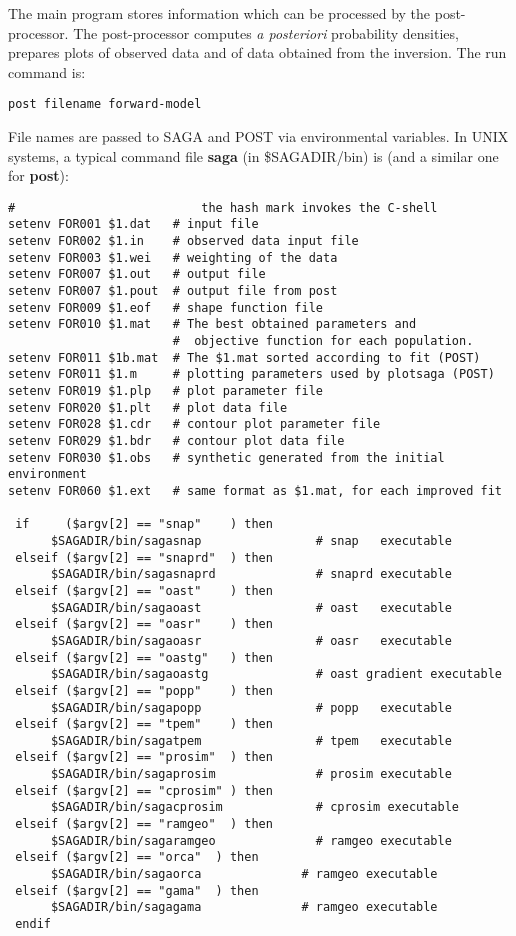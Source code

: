 \documentclass{saclantc}
\begin{document}
The main program stores information which can be processed by the 
post-processor.  The post-processor computes {\em a posteriori}
 probability densities, 
prepares plots of observed data and of data obtained from the inversion. 
The run command is:

{\tt post filename forward-model}


File names  are  passed  to   {\sf SAGA} and {\sf POST}   via 
environmental variables. In UNIX systems, a typical command  file 
{\bf saga} (in  \$SAGADIR/bin) is (and a similar one for {\bf post}):

\small
\begin{verbatim}
#                          the hash mark invokes the C-shell 
setenv FOR001 $1.dat   # input file
setenv FOR002 $1.in    # observed data input file
setenv FOR003 $1.wei   # weighting of the data 
setenv FOR007 $1.out   # output file
setenv FOR007 $1.pout  # output file from post
setenv FOR009 $1.eof   # shape function file
setenv FOR010 $1.mat   # The best obtained parameters and
                       #  objective function for each population.
setenv FOR011 $1b.mat  # The $1.mat sorted according to fit (POST)
setenv FOR011 $1.m     # plotting parameters used by plotsaga (POST)
setenv FOR019 $1.plp   # plot parameter file
setenv FOR020 $1.plt   # plot data file  
setenv FOR028 $1.cdr   # contour plot parameter file 
setenv FOR029 $1.bdr   # contour plot data file 
setenv FOR030 $1.obs   # synthetic generated from the initial environment
setenv FOR060 $1.ext   # same format as $1.mat, for each improved fit

 if     ($argv[2] == "snap"    ) then
      $SAGADIR/bin/sagasnap                # snap   executable
 elseif ($argv[2] == "snaprd"  ) then
      $SAGADIR/bin/sagasnaprd              # snaprd executable
 elseif ($argv[2] == "oast"    ) then
      $SAGADIR/bin/sagaoast                # oast   executable
 elseif ($argv[2] == "oasr"    ) then
      $SAGADIR/bin/sagaoasr                # oasr   executable
 elseif ($argv[2] == "oastg"   ) then
      $SAGADIR/bin/sagaoastg               # oast gradient executable
 elseif ($argv[2] == "popp"    ) then
      $SAGADIR/bin/sagapopp                # popp   executable
 elseif ($argv[2] == "tpem"    ) then
      $SAGADIR/bin/sagatpem                # tpem   executable
 elseif ($argv[2] == "prosim"  ) then
      $SAGADIR/bin/sagaprosim              # prosim executable
 elseif ($argv[2] == "cprosim" ) then
      $SAGADIR/bin/sagacprosim             # cprosim executable
 elseif ($argv[2] == "ramgeo"  ) then
      $SAGADIR/bin/sagaramgeo              # ramgeo executable
 elseif ($argv[2] == "orca"  ) then
      $SAGADIR/bin/sagaorca              # ramgeo executable
 elseif ($argv[2] == "gama"  ) then
      $SAGADIR/bin/sagagama              # ramgeo executable
 endif
\end{verbatim}
\normalsize
\end{document}
